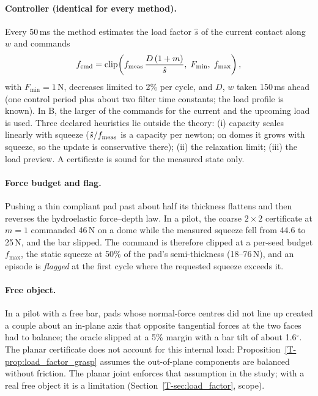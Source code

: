 \documentclass[11pt,a4paper]{article}
\newcommand{\T}[1]{\ref{T-#1}}                       %
\begin{document}
\paragraph{Controller (identical for every method).} Every 50\,ms the method estimates the load factor $\hat s$ of the current contact along $w$ and
commands
\begin{align}
    f_{\rm cmd}=\operatorname{clip}\!\left(f_{\rm meas}\,\frac{D\,(1+m)}{\hat s},\;F_{\min},\;f_{\max}\right),
\end{align}
with $F_{\min}=1$\,N, decreases limited to 2\% per cycle, and $D$, $w$ taken 150\,ms ahead (one control period plus about two filter time constants;
the load profile is known). In B, the larger of the commands for the current and the upcoming load is used. Three declared heuristics lie
outside the theory: (i) capacity scales linearly with squeeze ($\hat s/f_{\rm meas}$ is a capacity per newton; on domes it grows with squeeze, so the
update is conservative there); (ii) the relaxation limit; (iii) the load preview. A certificate is sound for the measured state only.

\paragraph{Force budget and flag.} Pushing a thin compliant pad past about half its thickness flattens and then reverses the hydroelastic
force--depth law. In a pilot, the coarse $2\times2$ certificate at $m=1$ commanded 46\,N on a dome while the measured squeeze fell from 44.6 to
25\,N, and the bar slipped. The command is therefore clipped at a per-seed budget $f_{\max}$, the static squeeze at 50\% of the pad's
semi-thickness (18--76\,N), and an episode is \emph{flagged} at the first cycle where the requested squeeze exceeds it.

\paragraph{Free object.} In a pilot with a free bar, pads whose normal-force centres did not line up created a couple about an in-plane axis that
opposite tangential forces at the two faces had to balance; the oracle slipped at a 5\% margin with a bar tilt of about 1.6$^\circ$. The planar
certificate does not account for this internal load: Proposition~\T{prop:load_factor_grasp} assumes the out-of-plane components are balanced without
friction. The planar joint enforces that assumption in the study; with a real free object it is a limitation (Section~\T{sec:load_factor}, scope).
\end{document}
